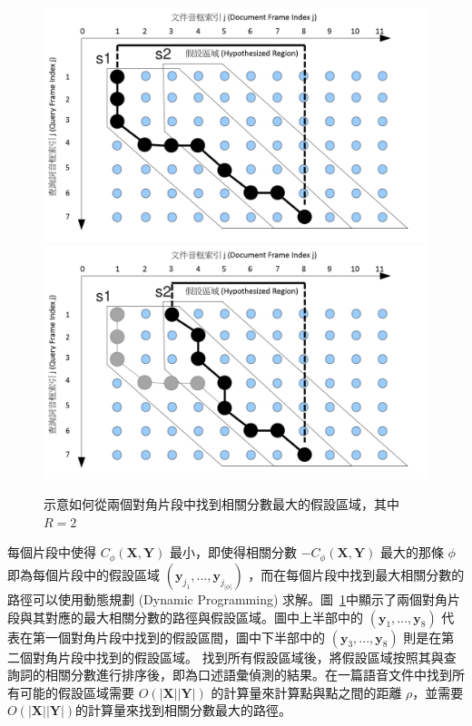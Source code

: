 \begin{figure}
\centering
\includegraphics[scale=0.45]{images/chap2_segdtw_exp1.png}
\includegraphics[scale=0.45]{images/chap2_segdtw_exp2.png}
\caption{示意如何從兩個對角片段中找到相關分數最大的假設區域，其中 $R=2$}
\label{fig:chap2_sdtw_exp}
\end{figure}





每個片段中使得 $C_{\phi}(\mathbf{X}, \mathbf{Y})$ 最小，即使得相關分數 $-C_{\phi}(\mathbf{X}, \mathbf{Y})$ 最大的那條 $\phi$ 即為每個片段中的假設區域 $(\mathbf{y}_{j_1},...,\mathbf{y}_{j_{|\phi|}})$ ，而在每個片段中找到最大相關分數的路徑可以使用動態規劃 (Dynamic Programming) 求解。圖~\ref{fig:chap2_sdtw_exp}中顯示了兩個對角片段與其對應的最大相關分數的路徑與假設區域。圖中上半部中的 $(\mathbf{y}_1, ..., \mathbf{y}_8)$ 代表在第一個對角片段中找到的假設區間，圖中下半部中的 $(\mathbf{y}_3, ..., \mathbf{y}_8)$ 則是在第二個對角片段中找到的假設區域。 找到所有假設區域後，將假設區域按照其與查詢詞的相關分數進行排序後，即為口述語彙偵測的結果。在一篇語音文件中找到所有可能的假設區域需要 $O(|\mathbf{X}||\mathbf{Y}|)$ 的計算量來計算點與點之間的距離 $\rho$，並需要$O(|\mathbf{X}||\mathbf{Y}|)$的計算量來找到相關分數最大的路徑。



